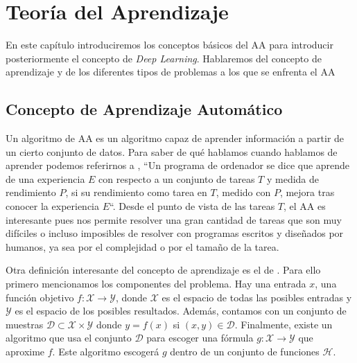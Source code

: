\chapter{Teoría del Aprendizaje}\label{sec:aa}
En este capítulo introduciremos los conceptos básicos del \ac{AA} para introducir posteriormente el concepto de \textit{Deep Learning}. Hablaremos del concepto de aprendizaje y de los diferentes tipos de problemas a los que se enfrenta el \ac{AA}

\section{Concepto de Aprendizaje Automático}
Un algoritmo de \ac{AA} es un algoritmo capaz de aprender información a partir de  un cierto conjunto de datos. Para saber de qué hablamos cuando hablamos de aprender podemos referirnos a \cite{mitchell-1997}, ``Un programa de ordenador se dice que aprende de una experiencia $E$ con respecto a un conjunto de tareas $T$ y medida de rendimiento $P$, si su rendimiento como tarea en $T$, medido con $P$, mejora tras conocer la experiencia $E$``. Desde el punto de vista de las tareas $T$, el \ac{AA} es interesante pues nos permite resolver una gran cantidad de tareas que son muy difíciles o incluso imposibles de resolver con programas escritos y diseñados por humanos, ya sea por el complejidad o por el tamaño de la tarea.

Otra definición interesante del concepto de aprendizaje es el de \cite{learningfromdata}. Para ello primero mencionamos los componentes del problema. Hay una entrada $x$, una función objetivo $f: \mathcal{X} \to \mathcal{Y}$, donde $\mathcal{X}$ es el espacio de todas las posibles entradas y $\mathcal{Y}$ es el espacio de los posibles resultados. Además, contamos con un conjunto de muestras $\mathcal{D} \subset \mathcal{X} \times \mathcal{Y}$ donde $y = f(x)$ si $(x, y) \in \mathcal{D}$. Finalmente, existe un algoritmo que usa el conjunto $\mathcal{D}$ para escoger una fórmula $g: \mathcal{X} \to \mathcal{Y}$ que aproxime $f$. Este algoritmo escogerá $g$ dentro de un conjunto de funciones $\mathcal{H}$.

